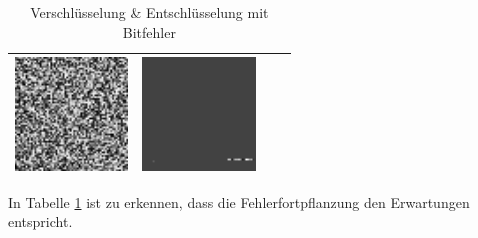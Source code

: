 \begin{table}
\begin{center}
\begin{tabular}{|c|c|c|c|}
        \includegraphics[width=3cm]{img/error/output_CBC} &
        \includegraphics[width=3cm]{img/error/output_CBC_decrypt} \\
        \hline
        \end{tabular}   
    \end{center}
    \caption{Verschlüsselung \& Entschlüsselung mit Bitfehler}
    \label{tab:biterror}
\end{table}
In Tabelle \ref{tab:biterror} ist zu erkennen, dass die Fehlerfortpflanzung den Erwartungen entspricht.
\newpage
